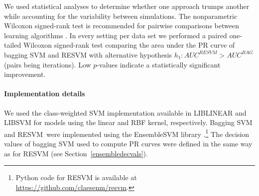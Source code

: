 \documentclass[preprint,elsarticle-num,12pt]{elsarticle}
\newcommand{\resvm}{RESVM}
\begin{document}
We used statistical analyses to determine whether one approach trumps another while accounting for the variability between simulations. %
The nonparametric Wilcoxon signed-rank test is recommended for pairwise comparisons between learning algorithms \citep{demvsar2006statistical}. In every setting per data set we performed a paired one-tailed Wilcoxon signed-rank test comparing the area under the PR curve of bagging SVM and RESVM with alternative hypothesis $h_1: AUC^{\resvm} > AUC^{BAG}$ (pairs being iterations). Low $p$-values indicate a statistically significant improvement. 


\paragraph{Implementation details}
We used the class-weighted SVM implementation available in LIBLINEAR \citep{Fan:2008:LLL:1390681.1442794} and LIBSVM \citep{CC01a} for models using the linear and RBF kernel, respectively. Bagging SVM and \resvm\ were implemented using the EnsembleSVM library \citep{ensemblesvm-jmlr}.\footnote{Python code for RESVM is available at \url{https://github.com/claesenm/resvm}.} The decision values of bagging SVM used to compute PR curves were defined in the same way as for RESVM (see Section~\ref{ensembledecvals}).


\end{document}
